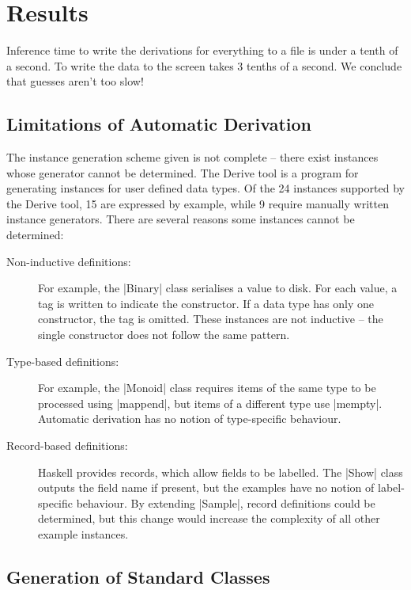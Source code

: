 \documentclass[preprint]{sigplanconf}
\begin{document}
\section{Results}
\label{sec:results}

Inference time to write the derivations for everything to a file is under a tenth of a second. To write the data to the screen takes 3 tenths of a second. We conclude that guesses aren't too slow!

\subsection{Limitations of Automatic Derivation}
\label{sec:failure}

The instance generation scheme given is not complete -- there exist instances whose generator cannot be determined. The Derive tool \cite{derive} is a program for generating instances for user defined data types. Of the 24 instances supported by the Derive tool, 15 are expressed by example, while 9 require manually written instance generators. There are several reasons some instances cannot be determined:

\begin{description}

\item[Non-inductive definitions:] For example, the |Binary| class serialises a value to disk. For each value, a tag is written to indicate the constructor. If a data type has only one constructor, the tag is omitted. These instances are not inductive -- the single constructor does not follow the same pattern.

\item[Type-based definitions:] For example, the |Monoid| class requires items of the same type to be processed using |mappend|, but items of a different type use |mempty|. Automatic derivation has no notion of type-specific behaviour.

\item [Record-based definitions:] Haskell provides records, which allow fields to be labelled. The |Show| class outputs the field name if present, but the examples have no notion of label-specific behaviour. By extending |Sample|, record definitions could be determined, but this change would increase the complexity of all other example instances.

\end{description}

\subsection{Generation of Standard Classes}
\label{sec:automatic_success}
\end{document}
